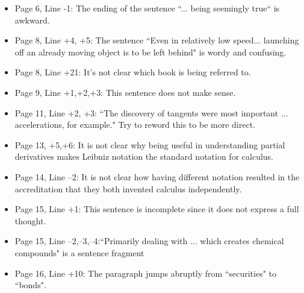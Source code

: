 \documentclass[11pt]{article}
\begin{document}
\begin{itemize}
\begin{itemize}
		\item Page 6, Line -1: The ending of the sentence ``... being seemingly true`` is awkward.
		\item Page 8, Line +4, +5: The sentence ``Even in relatively low speed... launching off an already moving object is to be left behind" is wordy and confusing. 
		\item Page 8, Line +21: It's not clear which book is being referred to.
		\item Page 9, Line +1,+2,+3: This sentence does not make sense. 
		\item Page 11, Line +2, +3: ``The discovery of tangents were most important ... accelerations, for example." Try to reword this to be more direct.
		\item Page 13, +5,+6: It is not clear why being useful in understanding partial derivatives makes Leibniz notation the standard notation for calculus.
		\item Page 14, Line --2: It is not clear how having different notation resulted in the accreditation that they both invented calculus independently.
		\item Page 15, Line +1: This sentence is incomplete since it does not express a full thought.
		\item Page 15, Line --2,--3,--4:``Primarily dealing with ... which creates chemical compounds" is a sentence fragment
		\item Page 16, Line +10: The paragraph jumps abruptly from ``securities" to ``bonds".
	\end{itemize}
	

\end{itemize}
\end{document}
